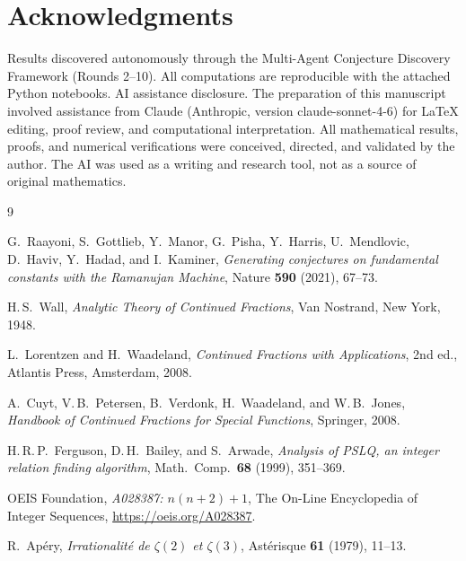 \documentclass[11pt,a4paper]{article}
\theoremstyle{definition}
\theoremstyle{remark}
\begin{document}
\section*{Acknowledgments}
Results discovered autonomously through the Multi-Agent Conjecture Discovery Framework (Rounds 2--10). All computations are reproducible with the attached Python notebooks. AI assistance disclosure. The preparation of this manuscript involved assistance from Claude (Anthropic, version claude-sonnet-4-6) for LaTeX editing, proof review, and computational interpretation. All mathematical results, proofs, and numerical verifications were conceived, directed, and validated by the author. The AI was used as a writing and research tool, not as a source of original mathematics.

\begin{thebibliography}{9}

G.~Raayoni, S.~Gottlieb, Y.~Manor, G.~Pisha, Y.~Harris, U.~Mendlovic,
D.~Haviv, Y.~Hadad, and I.~Kaminer,
\textit{Generating conjectures on fundamental constants with the Ramanujan Machine},
Nature \textbf{590} (2021), 67--73.

H.\,S.~Wall,
\textit{Analytic Theory of Continued Fractions},
Van Nostrand, New York, 1948.

L.~Lorentzen and H.~Waadeland,
\textit{Continued Fractions with Applications},
2nd ed., Atlantis Press, Amsterdam, 2008.

A.~Cuyt, V.\,B.~Petersen, B.~Verdonk, H.~Waadeland, and W.\,B.~Jones,
\textit{Handbook of Continued Fractions for Special Functions},
Springer, 2008.

H.\,R.\,P.~Ferguson, D.\,H.~Bailey, and S.~Arwade,
\textit{Analysis of PSLQ, an integer relation finding algorithm},
Math.\ Comp.\ \textbf{68} (1999), 351--369.

OEIS Foundation,
\textit{A028387: $n(n{+}2)+1$},
The On-Line Encyclopedia of Integer Sequences,
\url{https://oeis.org/A028387}.

R.~Ap\'ery,
\textit{Irrationalit\'e de $\zeta(2)$ et $\zeta(3)$},
Ast\'erisque \textbf{61} (1979), 11--13.

\end{thebibliography}
\end{document}
